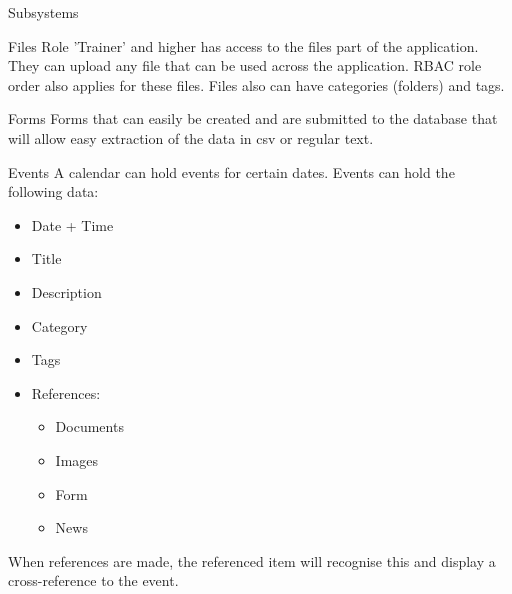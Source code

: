 \documentclass[10pt,a4paper]{article}
\begin{document}
\begin{section}{Subsystems}
    \begin{subsection}{Files}
        Role 'Trainer' and higher has access to the files part of the application.
        They can upload any file that can be used across the application. RBAC role order
        also applies for these files. Files also can have categories (folders) and tags.
    \end{subsection}
    
    \begin{subsection}{Forms}
        Forms that can easily be created and are submitted to the database that will
        allow easy extraction of the data in csv or regular text.
    \end{subsection}
    
    \begin{subsection}{Events}
        A calendar can hold events for certain dates.
        Events can hold the following data:
        \begin{itemize}
            \item Date + Time
            \item Title
            \item Description
            \item Category
            \item Tags
            \item References:
            \begin{itemize}
                \item Documents
                \item Images
                \item Form
                \item News
            \end{itemize}
        \end{itemize}
        When references are made, the referenced item will recognise this and display
        a cross-reference to the event.
    \end{subsection}
\end{section}
\end{document}
